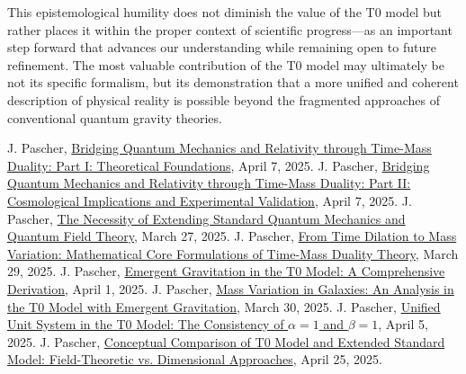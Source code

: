 \documentclass[12pt,a4paper]{article}
\begin{document}
	This epistemological humility does not diminish the value of the T0 model but rather places it within the proper context of scientific progress—as an important step forward that advances our understanding while remaining open to future refinement. The most valuable contribution of the T0 model may ultimately be not its specific formalism, but its demonstration that a more unified and coherent description of physical reality is possible beyond the fragmented approaches of conventional quantum gravity theories.
	
	
	\begin{thebibliography}{99}
		 J. Pascher, \href{https://github.com/jpascher/T0-Time-Mass-Duality/tree/main/2/pdf/English/QMRelTimeMassPart1En.pdf}{Bridging Quantum Mechanics and Relativity through Time-Mass Duality: Part I: Theoretical Foundations}, April 7, 2025.
		 J. Pascher, \href{https://github.com/jpascher/T0-Time-Mass-Duality/tree/main/2/pdf/English/QMRelTimeMassPart2En.pdf}{Bridging Quantum Mechanics and Relativity through Time-Mass Duality: Part II: Cosmological Implications and Experimental Validation}, April 7, 2025.
		 J. Pascher, \href{https://github.com/jpascher/T0-Time-Mass-Duality/tree/main/2/pdf/English/NotwendigkeitQMErweiterungEn.pdf}{The Necessity of Extending Standard Quantum Mechanics and Quantum Field Theory}, March 27, 2025.
		 J. Pascher, \href{https://github.com/jpascher/T0-Time-Mass-Duality/tree/main/2/pdf/English/MathZeitMasseLagrangeEn.pdf}{From Time Dilation to Mass Variation: Mathematical Core Formulations of Time-Mass Duality Theory}, March 29, 2025.
		 J. Pascher, \href{https://github.com/jpascher/T0-Time-Mass-Duality/tree/main/2/pdf/English/EmergentGravT0En.pdf}{Emergent Gravitation in the T0 Model: A Comprehensive Derivation}, April 1, 2025.
		 J. Pascher, \href{https://github.com/jpascher/T0-Time-Mass-Duality/tree/main/2/pdf/English/MassVarGalaxienEn.pdf}{Mass Variation in Galaxies: An Analysis in the T0 Model with Emergent Gravitation}, March 30, 2025.
		 J. Pascher, \href{https://github.com/jpascher/T0-Time-Mass-Duality/tree/main/2/pdf/English/Alpha1Beta1KonsistenzEn.pdf}{Unified Unit System in the T0 Model: The Consistency of $\alpha = 1$ and $\beta = 1$}, April 5, 2025.
		 J. Pascher, \href{https://github.com/jpascher/T0-Time-Mass-Duality/tree/main/2/pdf/English/T0vsESM_ConceptualAnalysisEn.pdf}{Conceptual Comparison of T0 Model and Extended Standard Model: Field-Theoretic vs. Dimensional Approaches}, April 25, 2025.

\end{thebibliography}
\end{document}

